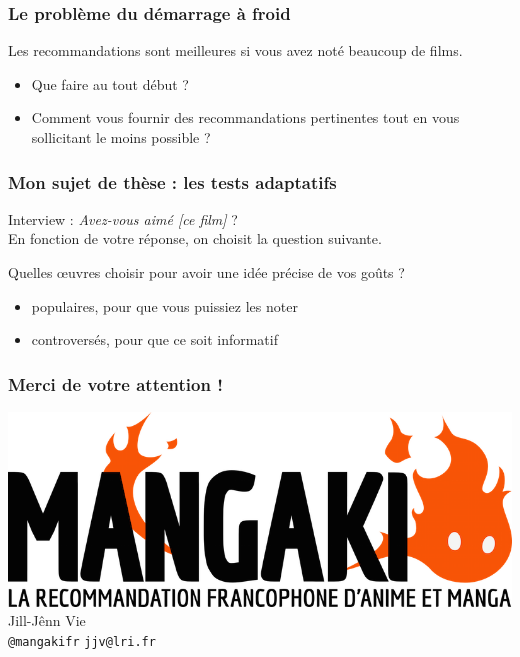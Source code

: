 \documentclass[handout]{beamer}
\begin{document}
\begin{frame}
	\frametitle{Le problème du démarrage à froid}
	Les recommandations sont \alert{meilleures} si vous avez noté \alert{beaucoup} de films.
	\vspace{1cm}
	\pause
	\begin{itemize}
	\item Que faire au tout début ?
	\item Comment vous fournir des recommandations pertinentes tout en vous sollicitant le moins possible ?
	\end{itemize}
\end{frame}

\begin{frame}
	\frametitle{Mon sujet de thèse : les tests adaptatifs}
	Interview : \og \emph{Avez-vous aimé [ce film]} ? \fg\\
	En fonction de votre réponse, on choisit la question suivante.\vspace{1cm}

	\pause	
	Quelles œuvres choisir pour avoir une idée précise de vos goûts ?
	\pause
	\begin{itemize}[<+->]
	\item \alert{populaires}, pour que vous puissiez les noter
	\item \alert{controversés}, pour que ce soit informatif
	\end{itemize}
	\pause
\end{frame}

\begin{frame}
	\frametitle{Merci de votre attention !}
	\centering
	\includegraphics{figures/mangaki.png}\\[8.4mm]
	\LARGE Jill-Jênn Vie\\[4.2mm]
	\texttt{@mangakifr} \hfill \texttt{jjv@lri.fr}
\end{frame}
\end{document}
